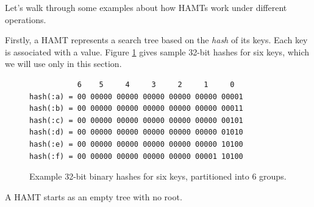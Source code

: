 \documentclass[preprint]{sigplanconf}
\begin{document}


Let's walk through some examples about how HAMTs
work under different operations.

Firstly, a HAMT represents a search tree
based on the \textit{hash} of its keys.
Each key is associated with a value.
Figure \ref{hashes} gives sample 32-bit hashes for six keys,
which we will use only in this section.

\begin{figure}
  \begin{verbatim}
           6    5     4     3     2     1     0
hash(:a) = 00 00000 00000 00000 00000 00000 00001
hash(:b) = 00 00000 00000 00000 00000 00000 00011
hash(:c) = 00 00000 00000 00000 00000 00000 00101
hash(:d) = 00 00000 00000 00000 00000 00000 01010
hash(:e) = 00 00000 00000 00000 00000 00000 10100
hash(:f) = 00 00000 00000 00000 00000 00001 10100
  \end{verbatim}
  \label{hashes}
  \caption{Example 32-bit binary hashes for six keys, partitioned
    into 6 groups.}
\end{figure}

A HAMT starts as an empty tree with no root.
\end{document}
